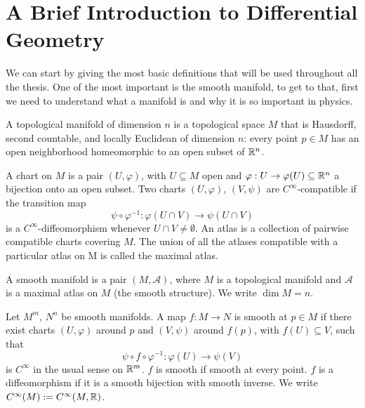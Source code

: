 
\setcounter{chapter}{1}


\section{A Brief Introduction to Differential Geometry}

We can start by giving the most basic definitions that will be used throughout all the thesis. One of the most important is the smooth manifold, to get to that, first we need to understand what a manifold is and why it is so important in physics.
\begin{definition}\label{def:top-man}
	A topological manifold of dimension $n$ is a topological space $M$ that is Hausdorff, second countable, and locally Euclidean of dimension $n$: every point $p \in M$ has an open neighborhood homeomorphic to an open subset of $\mathbb{R}^n$. \cite{abrahamFoundationsMechanics2008}
\end{definition}

\begin{definition}\label{def:chart-atlas}
	A chart on $M$ is a pair $(U,\varphi)$, with $U \subseteq M$ open and $\varphi: U \to \varphi(U) \subseteq \mathbb{R}^n$ a bijection onto an open subset. Two charts $(U,\varphi)$, $(V,\psi)$ are $C^\infty$-compatible if the transition map
	\[
	\psi \circ \varphi^{-1} : \varphi(U \cap V) \to \psi(U \cap V)
	\]
	is a $C^\infty$-diffeomorphism whenever $U \cap V \neq \emptyset$. An atlas is a collection of pairwise compatible charts covering $M$. The union of all the atlases compatible with a particular atlas on M is called the maximal atlas.
\end{definition}

\begin{definition}\label{def:smooth-man}
	A smooth manifold is a pair $(M,\mathcal{A})$, where $M$ is a topological manifold and $\mathcal{A}$ is a maximal atlas on $M$ (the smooth structure). We write $\dim M = n$.
\end{definition}

\begin{definition}\label{def:diffeo}
	Let $M^m$, $N^n$ be smooth manifolds. A map $f: M \to N$ is smooth at $p \in M$ if there exist charts $(U,\varphi)$ around $p$ and $(V,\psi)$ around $f(p)$, with $f(U) \subseteq V$, such that
	\[
	\psi \circ f \circ \varphi^{-1} : \varphi(U) \to \psi(V)
	\]
	is $C^\infty$ in the usual sense on $\mathbb{R}^m$. $f$ is smooth if smooth at every point. $f$ is a diffeomorphism if it is a smooth bijection with smooth inverse. We write $C^\infty(M) := C^\infty(M,\mathbb{R})$.
\end{definition}
\medspace

